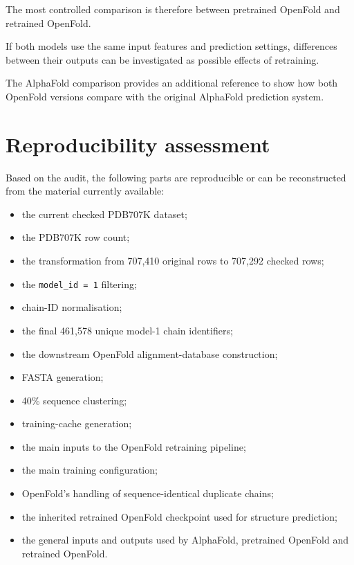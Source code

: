 \documentclass[11pt,a4paper]{article}
\begin{document}
The most controlled comparison is therefore between pretrained OpenFold and retrained OpenFold.

If both models use the same input features and prediction settings, differences between their outputs can be investigated as possible effects of retraining.

The AlphaFold comparison provides an additional reference to show how both OpenFold versions compare with the original AlphaFold prediction system.


\section{Reproducibility assessment}

Based on the audit, the following parts are reproducible or can be reconstructed from the material currently available:

\begin{itemize}[leftmargin=*]

    \item the current checked PDB707K dataset;

    \item the PDB707K row count;

    \item the transformation from 707,410 original rows to 707,292 checked rows;

    \item the \texttt{model\_id = 1} filtering;

    \item chain-ID normalisation;

    \item the final 461,578 unique model-1 chain identifiers;

    \item the downstream OpenFold alignment-database construction;

    \item FASTA generation;

    \item 40\% sequence clustering;

    \item training-cache generation;

    \item the main inputs to the OpenFold retraining pipeline;

    \item the main training configuration;

    \item OpenFold's handling of sequence-identical duplicate chains;

    \item the inherited retrained OpenFold checkpoint used for structure prediction;

    \item the general inputs and outputs used by AlphaFold, pretrained OpenFold and retrained OpenFold.

\end{itemize}
\end{document}
